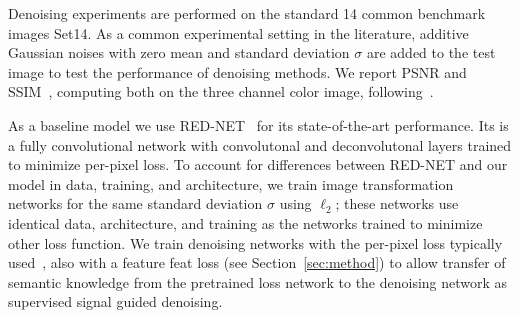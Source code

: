 Denoising experiments are performed on the standard 14 common benchmark images Set14. As a common experimental setting in the literature, additive Gaussian noises with zero mean and standard deviation $\sigma$ are added to the test image to test the performance of denoising methods. We report PSNR and SSIM~\cite{Wang2004}, computing both on the three channel color image, following~\cite{Mao2016,Zhao2015}.

As a baseline model we use RED-NET~\cite{Mao2016} for its state-of-the-art performance. Its is a fully convolutional network with convolutonal and deconvolutonal layers trained to minimize per-pixel loss. To account for differences between RED-NET and our model in data, training, and architecture, we train image transformation networks for the same standard deviation $\sigma$ using $\ell_{2}$; these networks use identical data, architecture, and training as the networks trained to minimize other loss function. We train denoising networks with the per-pixel loss typically used~\cite{Mao2016,Zhao2015}, also with a feature feat loss (see Section~\ref{sec:method}) to allow transfer of semantic knowledge from the pretrained loss network to the denoising network as supervised signal guided denoising.


